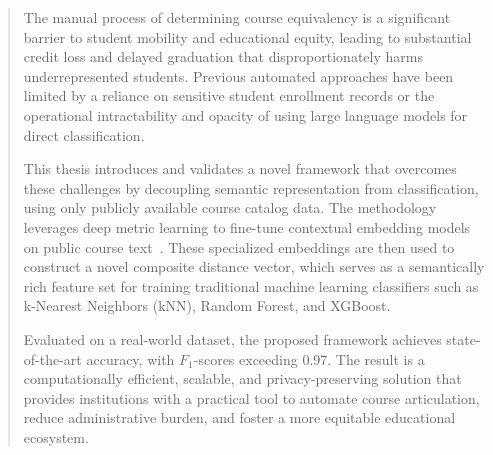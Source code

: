 \begin{abstract}
The manual process of determining course equivalency is a significant barrier to student mobility and educational equity, leading to substantial credit loss and delayed graduation that disproportionately harms underrepresented students. Previous automated approaches have been limited by a reliance on sensitive student enrollment records or the operational intractability and opacity of using large language models for direct classification.

This thesis introduces and validates a novel framework that overcomes these challenges by decoupling semantic representation from classification, using only publicly available course catalog data. The methodology leverages deep metric learning to fine-tune contextual embedding models on public course text~\cite{sym11091066}. These specialized embeddings are then used to construct a novel composite distance vector, which serves as a semantically rich feature set for training traditional machine learning classifiers such as k-Nearest Neighbors (kNN), Random Forest, and XGBoost.

Evaluated on a real-world dataset, the proposed framework achieves state-of-the-art accuracy, with \(F_1\)-scores exceeding 0.97. The result is a computationally efficient, scalable, and privacy-preserving solution that provides institutions with a practical tool to automate course articulation, reduce administrative burden, and foster a more equitable educational ecosystem.
\end{abstract}